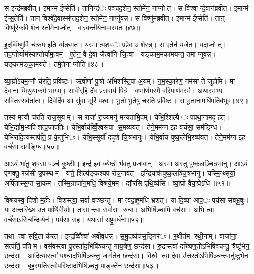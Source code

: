स इन्द्र॑मब्रवीत्। इ॒मान्म॑ ई॒प्सेति॑। तानिन्द्र॑ः पञ्चद॒शेन॒ स्तोमे॑न॒ नाप्नोत्। स विश्वान्दे॒वान॑ब्रवीत्। इ॒मान्म॑ ईप्स॒तेति॑। तान् विश्वे॑दे॒वास्स॑प्तद॒शेन॒ स्तोमे॑न॒ नाप्नु॑वन्न्। स विष्णु॑मब्रवीत्। इ॒मान्म॑ ई॒प्सेति॑। ताऩ् विष्णु॑रेकवि॒शेन॒ स्तोमे॑नाप्नोत्। वा॒र॒व॒न्तीये॑नावारयत॥४७॥

इ॒दव्विँष्णु॒र्वि च॑क्रम॒ इति॒ व्य॑क्रमत। यस्मात्प॒शव॒ः प्रप्रेव॒ भ्रशे॑रन्न्। स ए॒तेन॑ यजेत। यदाप्नोत्। तद॒प्तोर्याम॑स्याप्तोर्याम॒त्वम्। ए॒तेन॒ वै दे॒वा जैत्वा॑नि जि॒त्वा। यङ्काम॒मका॑मयन्त॒ तमाप्नुवन्न्। यङ्काम॑ङ्का॒मय॑ते। तमे॒तेनाप्नोति॥४८॥


व्या॒घ्रो॑ऽयम॒ग्नौ च॑रति॒ प्रवि॑ष्टः। ऋषी॑णां पु॒त्रो अ॑भिशस्ति॒पा अ॒यम्। न॒म॒स्का॒रेण॒ नम॑सा ते जुहोमि। मा दे॒वानाम्मिथु॒याक॑र्म भा॒गम्। सावी॒र्॒हि दे॑व प्रस॒वाय॑ पित्रे। व॒र्ष्माण॑मस्मै वरि॒माण॑मस्मै। अथा॒स्मभ्य सवितस्स॒र्वता॑ता। दि॒वेदि॑व॒ आ सु॑वा॒ भूरि॑ प॒श्वः। भू॒तो भू॒तेषु॑ चरति॒ प्रवि॑ष्टः। स भू॒ताना॒मधि॑पतिर्बभूव॥४९॥

तस्य॑ मृ॒त्यौ च॑रति राज॒सूयम्। स राजा॑ रा॒ज्यमनु॑ मन्यतामि॒दम्। येभि॒श्शिल्पैः पप्रथा॒नामदृहत्। येभि॒र्द्याम॒भ्यपिशत्प्र॒जाप॑तिः। येभि॒र्वाच॑व्विँ॒श्वरू॑पा स॒मव्य॑यत्। तेने॒मम॑ग्न इ॒ह वर्च॑सा॒ सम॑ङ्ग्धि। येभि॑रादि॒त्यस्तप॑ति॒ प्र के॒तुभि॑ः। येभि॒स्सूर्यो॑ ददृ॒शे चि॒त्रभा॑नुः। येभि॒र्वाचं॑ पुष्क॒लेभि॒रव्य॑यत्। तेने॒मम॑ग्न इ॒ह वर्च॑सा॒ सम॑ङ्ग्धि॥५०॥

आऽयं भा॑तु॒ शव॑सा॒ पञ्च॑ कृ॒ष्टीः। इन्द्र॑ इव ज्ये॒ष्ठो भ॑वतु प्र॒जावान्॑। अ॒स्मा अ॑स्तु पुष्क॒लञ्चि॒त्रभा॑नु। आऽयं पृ॑णक्तु॒ रज॑सी उ॒पस्थम्। यत्ते॒ शिल्प॑ङ्कश्यप रोच॒नाव॑त्। इ॒न्द्रि॒याव॑त्पुष्क॒लञ्चि॒त्रभा॑नु। यस्मि॒न्थ्सूर्या॒ अर्पि॑तास्स॒प्त सा॒कम्। तस्मि॒न्राजा॑न॒मधि॒ विश्र॑ये॒मम्। द्यौर॑सि पृथि॒व्य॑सि। व्या॒घ्रो वैया॒घ्रेऽधि॑ ॥५१॥

विश्र॑यस्व॒ दिशो॑ म॒हीः। विश॑स्त्वा॒ सर्वा॑ वाञ्छन्तु। मा त्वद्रा॒ष्ट्रमधि॑ भ्रशत्। या दि॒व्या आप॒ः पय॑सा संबभू॒वुः। या अ॒न्तरि॑ख्ष उ॒त पार्थि॑वी॒र्याः। तासान्त्वा॒ सर्वा॑सा रु॒चा। अ॒भिषि॑ञ्चामि॒ वर्च॑सा। अ॒भि त्वा॒ वर्च॑साऽसिचन्दि॒व्येन॑। पय॑सा स॒ह। यथासा॑ राष्ट्र॒वर्ध॑नः॥५२॥

तथा त्वा सवि॒ता क॑रत्। इन्द्र॒व्विँश्वा॑ अवीवृधन्न्। स॒मु॒द्रव्य॑चस॒ङ्गिर॑ः। र॒थीत॑म रथी॒नाम्। वाजा॑ना॒ सत्प॑तिं॒ पतिम्। वस॑वस्त्वा पु॒रस्ता॑द॒भिषि॑ञ्चन्तु गाय॒त्रेण॒ छन्द॑सा। रु॒द्रास्त्वा॑ दख्षिण॒तो॑ऽभिषि॑ञ्चन्तु॒ त्रैष्टु॑भेन॒ छन्द॑सा। आ॒दि॒त्यास्त्वा॑ प॒श्चाद॒भिषि॑ञ्चन्तु॒ जाग॑तेन॒ छन्द॑सा। विश्वे त्वा दे॒वा उ॑त्तर॒तो॑ऽभिषि॑ञ्च॒न्त्वानु॑ष्टुभेन॒ छन्द॑सा। बृह॒स्पति॑स्त्वो॒परि॑ष्टाद॒भिषि॑ञ्चतु॒ पाङ्क्ते॑न॒ छन्द॑सा॥५३॥

